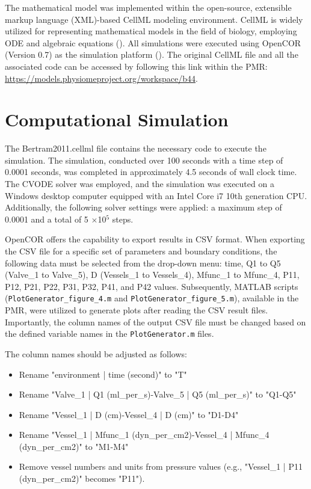 \documentclass[fleqn,10pt]{physiome}
\begin{document}
The mathematical model was implemented within the open-source, extensible markup language (XML)-based CellML modeling environment. CellML is widely utilized for representing mathematical models in the field of biology, employing ODE and algebraic equations (\citealp{cuellar2003overview}). All simulations were executed using OpenCOR (Version 0.7) as the simulation platform (\citealp{garny2015opencor}). The original CellML file and all the associated code can be accessed by following this link within the PMR: \url{https://models.physiomeproject.org/workspace/b44}.


\section{Computational Simulation}

The Bertram2011.cellml file contains the necessary code to execute the simulation. The simulation, conducted over 100 seconds with a time step of 0.0001 seconds, was completed in approximately 4.5 seconds of wall clock time. The CVODE solver was employed, and the simulation was executed on a Windows desktop computer equipped with an Intel Core i7 10th generation CPU. Additionally, the following solver settings were applied: a maximum step of 0.0001 and a total of 5 $\times$10$^{5}$ steps.


OpenCOR offers the capability to export results in CSV format. When exporting the CSV file for a specific set of parameters and boundary conditions, the following data must be selected from the drop-down menu: time, Q1 to Q5 (Valve\_1 to Valve\_5), D (Vessels\_1 to Vessels\_4), Mfunc\_1 to Mfunc\_4, P11, P12, P21, P22, P31, P32, P41, and P42 values. Subsequently, MATLAB scripts (\texttt{PlotGenerator\_figure\_4.m} and \texttt{PlotGenerator\_figure\_5.m}), available in the PMR, were utilized to generate plots after reading the CSV result files. Importantly, the column names of the output CSV file must be changed based on the defined variable names in the \texttt{PlotGenerator.m} files.

The column names should be adjusted as follows:
\begin{itemize}
    \item Rename "environment | time (second)" to "T"
    \item Rename "Valve\_1 | Q1 (ml\_per\_s)-Valve\_5 | Q5 (ml\_per\_s)" to "Q1-Q5"
     \item Rename "Vessel\_1 | D (cm)-Vessel\_4 | D (cm)" to "D1-D4"
    \item Rename "Vessel\_1 | Mfunc\_1 (dyn\_per\_cm2)-Vessel\_4 | Mfunc\_4 (dyn\_per\_cm2)" to "M1-M4"
    \item Remove vessel numbers and units from pressure values (e.g., "Vessel\_1 | P11 (dyn\_per\_cm2)" becomes "P11").
\end{itemize}
\end{document}
